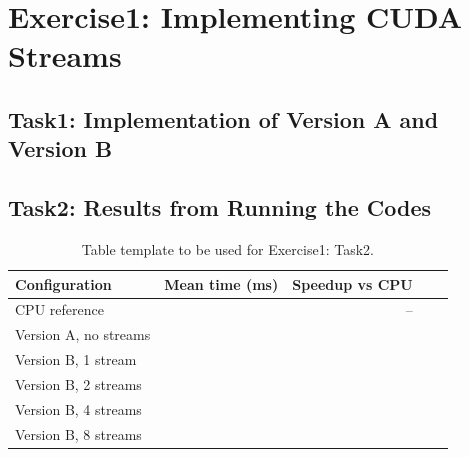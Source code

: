 \documentclass[a4paper,%
11pt,%
DIV12,
headsepline,%
headings=normal,
]{scrartcl}
\begin{document}
\maketitlepage

\section{Exercise1: Implementing CUDA Streams}

\subsection{Task1: Implementation of Version A and Version B}

\subsection{Task2: Results from Running the Codes}

\begin{table}[h]
\centering
\footnotesize
\begin{tabular}{lrrrr}
\toprule
\textbf{Configuration} & \textbf{Mean time (ms)} & \textbf{Speedup vs CPU} \\
\midrule
CPU reference                         & \todo{\hspace{1cm}} & --  \\
Version A, no streams                 & \todo{\hspace{1cm}} & \todo{\hspace{1cm}} \\
Version B, 1 stream                   & \todo{\hspace{1cm}} & \todo{\hspace{1cm}} \\
Version B, 2 streams                  & \todo{\hspace{1cm}} & \todo{\hspace{1cm}} \\
Version B, 4 streams                  & \todo{\hspace{1cm}} & \todo{\hspace{1cm}} \\
Version B, 8 streams                  & \todo{\hspace{1cm}} & \todo{\hspace{1cm}} \\
\bottomrule
\end{tabular}
\caption{Table template to be used for Exercise1: Task2.}
\label{tab:streams}
\end{table}
\end{document}
